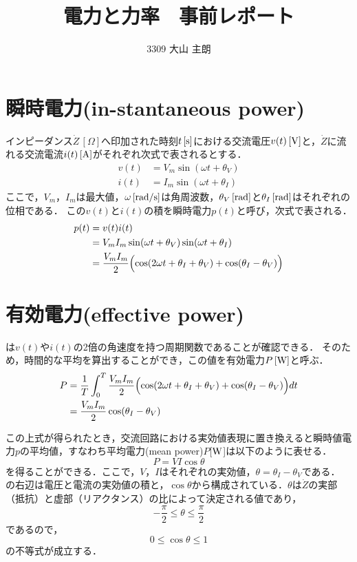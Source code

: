 \documentclass[11pt,dvipdfmx]{ujarticle}
\begin{document}
\title{電力と力率　事前レポート}
\author{3309 大山 主朗}
\date{}
\maketitle
\section{瞬時電力(in-stantaneous power)\cite{11300007922816}\cite{1130282271973066112}}
インピーダンス$\dot{Z}\,[\Omega]$へ印加された時刻$t\,[\rm{s}]$における交流電圧$v(t)\,[\rm{V}]$と，$\dot{Z}$に流れる交流電流$i(t)\,[\rm{A}]$がそれぞれ次式で表されるとする．
\begin{align}
	v(t) &= V_m\sin(\omega t+\theta_V)\\
	i(t) &= I_m\sin(\omega t + \theta_I)
\end{align}
ここで，$V_m$，$I_m$は最大値，$\omega\,[\rm{rad/s}]$は角周波数，$\theta_V\,[\rm{rad}]$と$\theta_I\,[\rm{rad}]$はそれぞれの位相である．
この$v(t)$と$i(t)$の積を瞬時電力$p(t)$と呼び，次式で表される．
\begin{align}
	p(t)&= v(t)i(t)\nonumber\\
	&=V_mI_m\sin(\omega t+\theta_V)\sin(\omega t + \theta_I)\nonumber\\
	&= \frac{V_mI_m}{2}\Bigl(\cos(2\omega t + \theta_I+\theta_V)+\cos(\theta_I - \theta_V)\Bigr)
	\label{eq:ip}
\end{align}

\section{有効電力(effective power)\cite{11300007922816}\cite{113028223066112}}
は$v(t)$や$i(t)$の2倍の角速度を持つ周期関数であることが確認できる．
そのため，時間的な平均を算出することができ，この値を有効電力$P\,[\rm{W}]$と呼ぶ．
\begin{align}
	P &=\frac{1}{T}\int_0^T \frac{V_mI_m}{2}\Bigl(\cos(2\omega t + \theta_I+\theta_V)+\cos(\theta_I - \theta_V)\Bigr) dt\nonumber\\
	&=\frac{V_mI_m}{2}\cos(\theta_I - \theta_V)
\end{align}

この上式が得られたとき，交流回路における実効値表現に置き換えると瞬時値電力$p$の平均値，すなわち平均電力(mean power)$P$[$\rm{W}$]は以下のように表せる．
\begin{equation}
	P = VI\cos\theta
	\label{eq:power}
\end{equation}
を得ることができる．ここで，$V$，$I$はそれぞれの実効値，$\theta=\theta_I-\theta_V$である．
の右辺は電圧と電流の実効値の積と，$\cos\theta$から構成されている．$\theta$は$\dot{Z}$の実部（抵抗）と虚部（リアクタンス）の比によって決定される値であり，
\begin{equation}
	-\frac{\pi}{2}\leq\theta\leq\frac{\pi}{2}
\end{equation}
であるので，
\begin{equation}
	0\leq\cos\theta\leq 1
	\label{eq:angle}
\end{equation}
の不等式が成立する．
\end{document}

